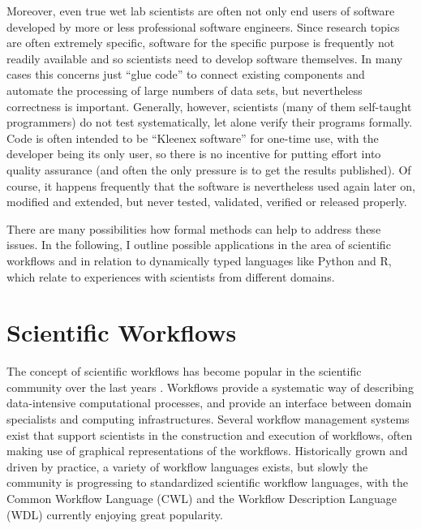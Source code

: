 \documentclass[sigplan,10pt,noacm]{acmart}
\begin{document}
Moreover, even true wet lab scientists are often not only end users of software developed by more or less professional software engineers. Since research topics are often extremely specific, software for the specific purpose is frequently not readily available and so scientists need to develop software themselves. In many cases this concerns just \enquote{glue code} to connect existing components and automate the processing of large numbers of data sets, but nevertheless correctness is important. Generally, however, scientists (many of them self-taught programmers) do not test systematically, let alone verify their programs formally. Code is often intended to be \enquote{Kleenex software} for one-time use, with the developer being its only user, so there is no incentive for putting effort into quality assurance (and often the only pressure is to get the results published). Of course, it happens frequently that the software is nevertheless used again later on, modified and extended, but never tested, validated, verified or released properly.

There are many possibilities how formal methods can help to address these issues. In the following, I outline possible applications in the area of scientific workflows and in relation to dynamically typed languages like Python and R, which relate to experiences with scientists from different domains. 

\section{Scientific Workflows}

The concept of scientific workflows has become popular in the scientific community over the last years \cite{AtGeMT2017}. Workflows provide a systematic way of describing data-intensive computational processes, and provide an interface between domain specialists and computing infrastructures. 
Several workflow management systems exist that support scientists in the construction and execution of workflows, often making use of graphical representations of the workflows. Historically grown and driven by practice, a variety of workflow languages exists, but slowly the community is progressing to standardized scientific workflow languages, with the Common Workflow Language (CWL) and the Workflow Description Language (WDL) currently enjoying great popularity. 
\end{document}
